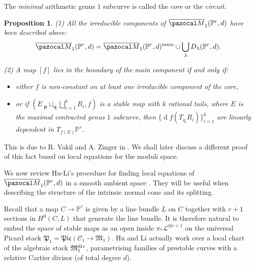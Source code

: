 \documentclass[11pt]{amsart}
\newcommand{\M}[4]{\overline{\pazocal M}_{#1,#2}(#3,#4)}
\newcommand{\PP}{\mathbb P}
\renewcommand{\to}{\rightarrow}
\newcommand{\cC}{\mathcal C}
\newcommand{\MM}{\mathfrak M}
\newcommand{\oM}{\overline{\pazocal M}}
\theoremstyle{plain}
\newtheorem{prop}[thm]{Proposition}
\theoremstyle{definition}
\begin{document}
\noindent The \emph{minimal} arithmetic genus $1$ subcurve is called the \emph{core} or the \emph{circuit}. %
\begin{prop}\label{prop:components}
\emph{(1)} All the irreducible components of $\oM_1(\PP^r,d)$ have been described above: %
\[\oM_1(\PP^r,d)=\oM_1(\PP^r,d)^{\rm{main}}\cup\bigcup_{\lambda}D_{\lambda}(\PP^r,d).\]

\emph{(2)} A map $[f]$ lies in \emph{the boundary of the main component}  if and only if:
\begin{itemize}
\item either $f$ is non-constant on at least one irreducible component of the core,
\item or if $(E\ {}_{\mathbf p}\!\sqcup_{\mathbf q}\bigsqcup_{i=1}^k R_i,f)$ is a stable map with $k$ rational tails, where $E$ is the \emph{maximal} contracted genus $1$ subcurve, then $\{\operatorname{d}\!f(T_{q_i}R_i)\}_{i=1}^k$ are \emph{linearly dependent} in $T_{f(E)}\PP^r$.
\end{itemize}
\end{prop}
 
This is due to R. Vakil and A. Zinger in \cite{Vre,VZpreview}. We shall later discuss a different proof of this fact based on local equations for the moduli space.

We now review Hu-Li's procedure for finding local equations of $\oM_1(\PP^r,d)$ in a smooth ambient space \cite{HL}. They will be useful when describing the structure of the intrinsic normal cone and its splitting.

Recall that a map $C\to\PP^r$ is given by a line bundle $L$ on $C$ together with $r+1$ sections in $H^0(C,L)$ that generate the line bundle. It is therefore natural to embed the space of stable maps as an open inside $\pi_*\mathcal L^{\oplus r+1}$ on the universal Picard stack $\mathfrak{P}_{1}=\mathfrak{Pic}(\cC_{1}\to\MM_{1})$.
Hu and Li actually work over a local chart of the algebraic stack $\mathfrak M_{1}^{\rm{div}}$, parametrising families of prestable curves with a relative Cartier divisor (of total degree $d$).
\end{document}
